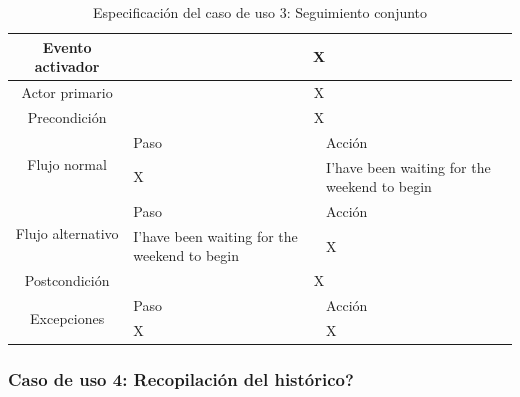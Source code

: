     \begin{table}[h]
        \centering
        \begin{tabularx}{\textwidth}{|c|X|X|}
            \hline
            Evento activador & \multicolumn{2}{|c|}{X} \\
            \hline
            Actor primario & \multicolumn{2}{|c|}{X} \\
            \hline
            Precondición & \multicolumn{2}{|c|}{X} \\
            \hline
            \multirow{2}{*}{Flujo normal} & Paso & Acción \\
            \cline{2-3} & X & I'have been waiting for the weekend to begin \\
            \hline
            \multirow{2}{*}{Flujo alternativo} & Paso & Acción \\
            \cline{2-3} & I'have been waiting for the weekend to begin & X \\
            \hline
            Postcondición & \multicolumn{2}{|c|}{X} \\
            \hline
            \multirow{2}{*}{Excepciones}  & Paso & Acción \\
            \cline{2-3} & X & X \\
            \hline
        \end{tabularx}
        \caption{Especificación del caso de uso 3: Seguimiento conjunto}
        \label{tabla:caso_uso_3}
    \end{table}
    
    \subsubsection{Caso de uso 4: Recopilación del histórico?}

